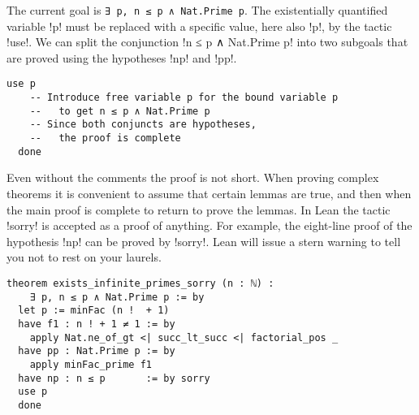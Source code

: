 The current goal is \Verb+∃ p, n ≤ p ∧ Nat.Prime p+. The existentially quantified variable !p! must be replaced with a specific value, here also !p!, by the tactic !use!.  We can split the conjunction !n ≤ p ∧ Nat.Prime p! into two subgoals that are proved using the hypotheses !np! and !pp!.

\begin{Verbatim}[firstnumber=last]
  use p
    -- Introduce free variable p for the bound variable p
    --   to get n ≤ p ∧ Nat.Prime p
    -- Since both conjuncts are hypotheses,
    --   the proof is complete
  done
\end{Verbatim}


Even without the comments the proof is not short. When proving complex theorems it is convenient to assume that certain lemmas are true, and then when the main proof is complete to return to prove the lemmas. In Lean the tactic !sorry! is accepted as a proof of anything. For example, the eight-line proof of the hypothesis !np! can be proved by !sorry!. Lean will issue a stern warning to tell you not to rest on your laurels.

\begin{Verbatim}[numbers=none]
theorem exists_infinite_primes_sorry (n : ℕ) :
    ∃ p, n ≤ p ∧ Nat.Prime p := by
  let p := minFac (n !  + 1)
  have f1 : n ! + 1 ≠ 1 := by
    apply Nat.ne_of_gt <| succ_lt_succ <| factorial_pos _
  have pp : Nat.Prime p := by
    apply minFac_prime f1
  have np : n ≤ p       := by sorry
  use p
  done
\end{Verbatim}


